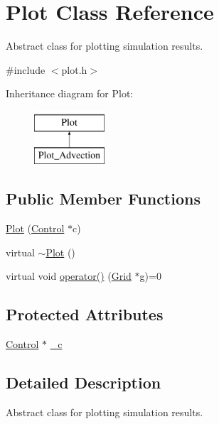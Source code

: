 \hypertarget{class_plot}{}\section{Plot Class Reference}
\label{class_plot}


Abstract class for plotting simulation results.  




{\ttfamily \#include $<$plot.\+h$>$}

Inheritance diagram for Plot\+:\begin{figure}[H]
\begin{center}
\leavevmode
\includegraphics[height=2.000000cm]{class_plot}
\end{center}
\end{figure}
\subsection*{Public Member Functions}
\begin{DoxyCompactItemize}
\item 
\hyperlink{class_plot_a6bb02285cc339b4fd9796a0331818463}{Plot} (\hyperlink{class_control}{Control} $\ast$c)
\item 
virtual \hyperlink{class_plot_ac71811ea4362a4c03e017a7a72125e1f}{$\sim$\+Plot} ()
\item 
virtual void \hyperlink{class_plot_a0c81ddc39ad4695024eb5ed493cba26e}{operator()} (\hyperlink{class_grid}{Grid} $\ast$g)=0
\end{DoxyCompactItemize}
\subsection*{Protected Attributes}
\begin{DoxyCompactItemize}
\item 
\hyperlink{class_control}{Control} $\ast$ \hyperlink{class_plot_afde6de3bfd787193d73fe24f6a44a479}{\+\_\+c}
\end{DoxyCompactItemize}


\subsection{Detailed Description}
Abstract class for plotting simulation results. 

